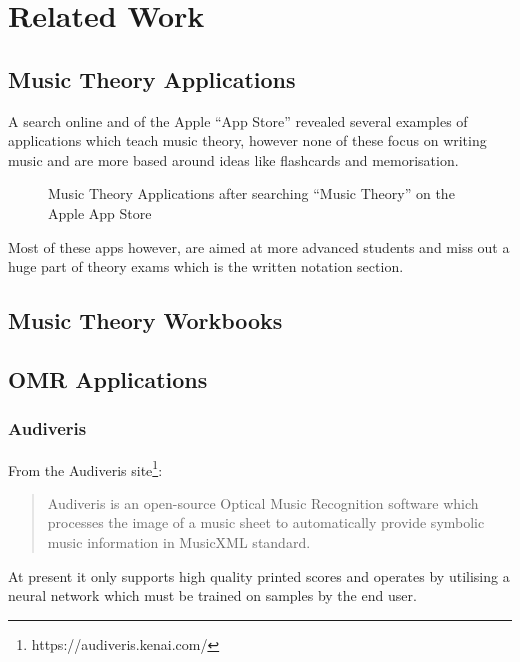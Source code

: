 \section{Related Work}

\subsection{Music Theory Applications}
A search online and of the Apple ``App Store'' revealed several examples of applications which teach music theory, however none of these focus on writing music and are more based around ideas like flashcards and memorisation.

\begin{figure}[h!]
  \centering
  \caption{Music Theory Applications after searching ``Music Theory'' on the Apple App Store}
\end{figure}

Most of these apps however, are aimed at more advanced students and miss out a huge part of theory exams which is the written notation section.

\subsection{Music Theory Workbooks}

\subsection{OMR Applications}
\subsubsection{Audiveris}
From the Audiveris site\footnote{https://audiveris.kenai.com/}:
\begin{quotation}
Audiveris is an open-source Optical Music Recognition software which processes the image of a music sheet to automatically provide symbolic music information in MusicXML standard.
\end{quotation}

At present it only supports high quality printed scores and operates by utilising a neural network which must be trained on samples by the end user.


